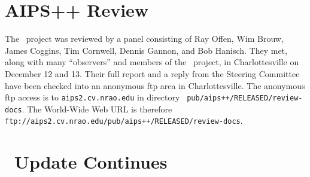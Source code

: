 \section{AIPS++ Review}

The \AIPTOO\ project was reviewed by a panel consisting of Ray Offen,
Wim Brouw, James Coggins, Tim Cornwell, Dennis Gannon, and Bob
Hanisch.  They met, along with many ``observers'' and members of the
\AIPTOO\ project, in Charlottesville on December 12 and 13.  Their
full report and a reply from the Steering Committee have been checked
into an anonymous ftp area in Charlottesville.  The anonymous ftp
access is to {\tt aips2.cv.nrao.edu} in directory {\tt
pub/aips++/RELEASED/review-docs}.  The World-Wide Web URL is therefore
{\tt ftp://aips2.cv.nrao.edu/pub/aips++/RELEASED/review-docs}.

\section{\Cookbook\ Update Continues}

